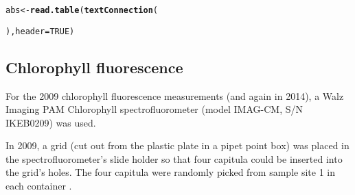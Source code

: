 \documentclass[12pt,a4paper,draft]{article}\usepackage[]{graphicx}\usepackage[]{color}
\makeatletter
\newcommand{\hlnum}[1]{\textcolor[rgb]{0.686,0.059,0.569}{#1}}%
\newcommand{\hlstd}[1]{\textcolor[rgb]{0.345,0.345,0.345}{#1}}%
\newcommand{\hlkwb}[1]{\textcolor[rgb]{0.69,0.353,0.396}{#1}}%
\newcommand{\hlkwc}[1]{\textcolor[rgb]{0.333,0.667,0.333}{#1}}%
\newcommand{\hlkwd}[1]{\textcolor[rgb]{0.737,0.353,0.396}{\textbf{#1}}}%
\newenvironment{kframe}{%
 \def\at@end@of@kframe{}%
 \ifinner\ifhmode%
  \def\at@end@of@kframe{\end{minipage}}%
  \begin{minipage}{\columnwidth}%
 \fi\fi%
 \def\FrameCommand##1{\hskip\@totalleftmargin \hskip-\fboxsep
 \colorbox{shadecolor}{##1}\hskip-\fboxsep
     \hskip-\linewidth \hskip-\@totalleftmargin \hskip\columnwidth}%
 \MakeFramed {\advance\hsize-\width
   \@totalleftmargin\z@ \linewidth\hsize
   \@setminipage}}%
 {\par\unskip\endMakeFramed%
 \at@end@of@kframe}
\newenvironment{knitrout}{}{} %
\makeatother
\begin{document}
\begin{knitrout}
\color{fgcolor}\begin{kframe}
\begin{alltt}
\hlstd{abs} \hlkwb{<-} \hlkwd{read.table}\hlstd{(} \hlkwd{textConnection}\hlstd{(}









































































 \hlstd{),} \hlkwc{header}\hlstd{=}\hlnum{TRUE}\hlstd{)}
\end{alltt}
\end{kframe}
\end{knitrout}

\subsection{Chlorophyll fluorescence}
  
For the 2009 chlorophyll fluorescence measurements (and again in 2014), a Walz Imaging PAM Chlorophyll spectrofluorometer (model IMAG-CM, S/N IKEB0209) was used.

In 2009, a grid (cut out from the plastic plate in a pipet point box) was placed in the spectrofluorometer's slide holder so that four capitula could be inserted into the grid's holes. The four capitula were randomly picked from sample site 1 in each container \citep[p.~17, fig.~18]{lanting2010}.
\end{document}
